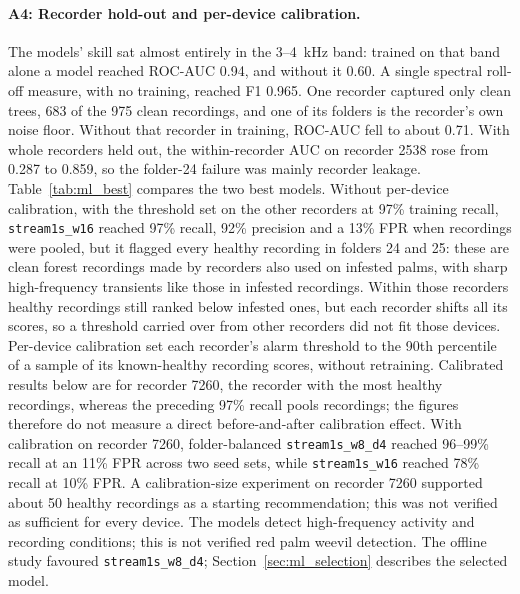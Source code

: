 \paragraph{A4: Recorder hold-out and per-device calibration.} The models' skill sat almost entirely in the 3--4~kHz band: trained on that band alone a model reached ROC-AUC 0.94, and without it 0.60. A single spectral roll-off measure, with no training, reached F1 0.965. One recorder captured only clean trees, 683 of the 975 clean recordings, and one of its folders is the recorder's own noise floor. Without that recorder in training, ROC-AUC fell to about 0.71. With whole recorders held out, the within-recorder AUC on recorder 2538 rose from 0.287 to 0.859, so the folder-24 failure was mainly recorder leakage. Table~\ref{tab:ml_best} compares the two best models. Without per-device calibration, with the threshold set on the other recorders at 97\% training recall, \texttt{stream1s\_w16} reached 97\% recall, 92\% precision and a 13\% FPR when recordings were pooled, but it flagged every healthy recording in folders 24 and 25: these are clean forest recordings made by recorders also used on infested palms, with sharp high-frequency transients like those in infested recordings. Within those recorders healthy recordings still ranked below infested ones, but each recorder shifts all its scores, so a threshold carried over from other recorders did not fit those devices. Per-device calibration set each recorder's alarm threshold to the 90th percentile of a sample of its known-healthy recording scores, without retraining. Calibrated results below are for recorder 7260, the recorder with the most healthy recordings, whereas the preceding 97\% recall pools recordings; the figures therefore do not measure a direct before-and-after calibration effect. With calibration on recorder 7260, folder-balanced \texttt{stream1s\_w8\_d4} reached 96--99\% recall at an 11\% FPR across two seed sets, while \texttt{stream1s\_w16} reached 78\% recall at 10\% FPR. A calibration-size experiment on recorder 7260 supported about 50 healthy recordings as a starting recommendation; this was not verified as sufficient for every device. The models detect high-frequency activity and recording conditions; this is not verified red palm weevil detection. The offline study favoured \texttt{stream1s\_w8\_d4}; Section~\ref{sec:ml_selection} describes the selected model.

